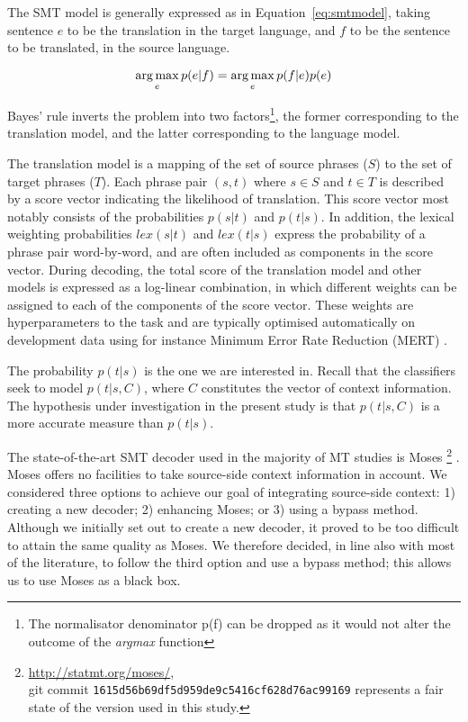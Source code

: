 The SMT model is generally expressed as in Equation~\ref{eq:smtmodel}, taking
sentence $e$ to be the translation in the target language, and $f$ to be the sentence to be
translated, in the source language.

\begin{equation}
\operatorname*{arg\,max}_e p(e|f) = \operatorname*{arg\,max}_e p(f|e)p(e)
\label{eq:smtmodel}
\end{equation}

Bayes' rule inverts the problem into two factors\footnote{The normalisator
denominator p(f) can be dropped as it would not alter the outcome of the
\emph{argmax} function}, the former corresponding to the translation model, and
the latter corresponding to the language model. 

The translation model is a mapping of the set of source phrases ($S$) to the
set of target phrases ($T$). Each phrase pair $(s,t)$ where $s \in S$ and $t
\in T$ is described by a score vector indicating the likelihood of
translation. This score vector most notably consists of the probabilities
$p(s|t)$ and $p(t|s)$. In addition, the lexical weighting probabilities $lex(s|t)$
and $lex(t|s)$ express the probability of a phrase pair word-by-word, and are
often included as components in the score vector. During decoding, the total
score of the translation model and other models is expressed as a log-linear
combination, in which different weights can be assigned to each of the
components of the score vector. These weights are hyperparameters to the task and
are typically optimised automatically on development data using for instance
Minimum Error Rate Reduction (MERT) \citep{MERT}.

The probability $p(t|s)$ is the one we are interested in. Recall that the
classifiers seek to model $p(t|s,C)$, where $C$ constitutes the vector of
context information. The hypothesis under investigation in the present study is
that $p(t|s,C)$ is a more accurate measure than $p(t|s)$.

The state-of-the-art SMT decoder used in the majority of MT studies is Moses
\footnote{\url{http://statmt.org/moses/}, \\ git commit
\texttt{1615d56b69df5d959de9c5416cf628d76ac99169} represents a fair state of the
version used in this study.} \citep{MOSES}. Moses offers no facilities to take
source-side context information in account. We considered three options to
achieve our goal of integrating source-side context: 1) creating a new decoder;
2) enhancing Moses; or 3) using a bypass method. Although we initially set out
to create a new decoder, it proved to be too difficult to attain the same
quality as Moses.  We therefore decided, in line also with most of the
literature, to follow the third option and use a bypass method; this allows us
to use Moses as a black box.

